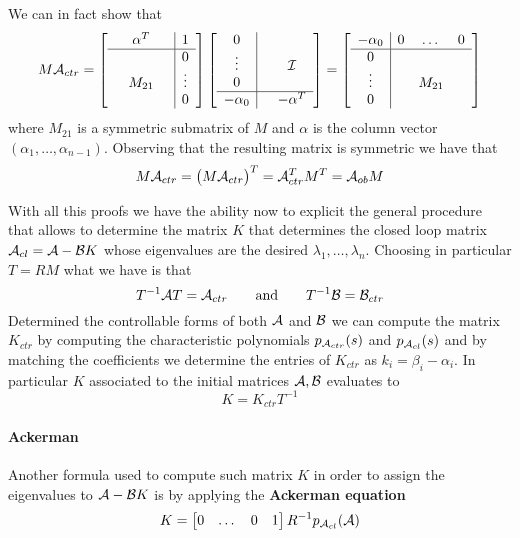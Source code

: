 		We can in fact show that
		\[ M \mathcal{A}_{ctr} = \begin{bmatrix} \begin{array} {c c c | c} 
				& \alpha^T & & 1\\ \hline
				&&& 0 \\
				& M_{21} & & \vdots \\
				&&& 0
		\end{array} \end{bmatrix} \begin{bmatrix} \begin{array} {c | c c c} 0 & \\
			\vdots & & \mathcal{I} \\ 0 & \\  \hline
			-\alpha_0 & & -\alpha^T			
		\end{array} \end{bmatrix} = \begin{bmatrix} \begin{array} {c | c c c}
			-\alpha_0  & 0 & \dots & 0 \\ \hline
			0 & \\ 
			\vdots & & M_{21} \\
			0 & 
		\end{array} \end{bmatrix} \]
		where $M_{21}$ is a symmetric submatrix of $M$ and $\alpha$  is the column vector $(\alpha_1,\dots,\alpha_{n-1})$. Observing that the resulting matrix is symmetric we have that
		\[ M \mathcal{A}_{ctr} = \big(M \mathcal{A}_{ctr}\big)^T = \mathcal{A}_{ctr}^T M^T = \mathcal{A}_{ob} M \]
		
		\vspace{3mm}
		With all this proofs we have the ability now to explicit the general procedure that allows to determine the matrix $K$ that determines the closed loop matrix $\mathcal{A}_{cl} = \mathcal{A} -\mathcal{B} K$ whose eigenvalues are the desired $\lambda_1,\dots, \lambda_n$. Choosing in particular $T= RM$ what we have is that
		\[ T^{-1} \mathcal{A} T = \mathcal{A}_{ctr} \qquad \textrm{and} \qquad T^{-1} \mathcal{B} = \mathcal{B}_{ctr} \]
		Determined the controllable forms of both $\mathcal{A}$ and $\mathcal{B}$ we can compute the matrix $K_{ctr}$ by computing the characteristic polynomials $p_{\mathcal{A}_{ctr}}(s)$ and $p_{\mathcal{A}_{cl}}(s)$ and by matching the coefficients we determine the entries of $K_{ctr}$ as $k_i = \beta_i - \alpha_i$. In particular $K$ associated to the initial matrices $\mathcal{A},\mathcal{B}$ evaluates to
		\[ K = K_{ctr} T^{-1} \]
		
		\paragraph{Ackerman} Another formula used to compute such matrix $K$ in order to assign the eigenvalues to $\mathcal{A} - \mathcal{B} K$ is by applying the \textbf{Ackerman equation}
		\[ K = \begin{bmatrix} 0 & \dots & 0 & 1 \end{bmatrix} R^{-1} p_{\mathcal{A}_{cl}} (\mathcal{A}) \]
		
		
		